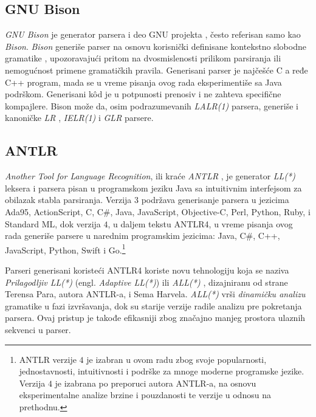 \subsection{GNU Bison}
\label{subsec:GNUBison}
\emph{GNU Bison} \cite{GNUBison} je generator parsera i deo GNU projekta \cite{GNUProject}, često referisan samo kao \emph{Bison}. \emph{Bison} generiše parser na osnovu korisnički definisane kontekstno slobodne gramatike \cite{AutomataTheory}, upozoravajući pritom na dvosmislenosti prilikom parsiranja ili nemogućnost primene gramatičkih pravila. Generisani parser je najčešće C a ređe C++ program, mada se u vreme pisanja ovog rada eksperimentiše sa Java podrškom. Generisani k\^od je u potpunosti prenosiv i ne zahteva specifične kompajlere. Bison može da, osim podrazumevanih \emph{LALR(1)} \cite{DragonBook} parsera, generiše i kanoničke \emph{LR} \cite{LR}, \emph{IELR(1)} \cite{IELR1} i \emph{GLR} \cite{GLR} parsere.

\subsection{ANTLR}
\label{subsec:ANTLR}
\emph{Another Tool for Language Recognition}, ili kraće \emph{ANTLR} \cite{ANTLR}, je generator \emph{LL(*)} \cite{LLStar} leksera i parsera pisan u programskom jeziku Java sa intuitivnim interfejsom za obilazak stabla parsiranja. Verzija $3$ podržava generisanje parsera u jezicima Ada95, ActionScript, C, C\#, Java, JavaScript, Objective-C, Perl, Python, Ruby, i Standard ML, dok verzija $4$, u daljem tekstu ANTLR4, u vreme pisanja ovog rada generiše parsere u narednim programskim jezicima: Java, C\#, C++, JavaScript, Python, Swift i Go.\footnote{ANTLR verzije $4$ je izabran u ovom radu zbog svoje popularnosti, jednostavnosti, intuitivnosti i podrške za mnoge moderne programske jezike. Verzija $4$ je izabrana po preporuci autora ANTLR-a, na osnovu eksperimentalne analize brzine i pouzdanosti te verzije u odnosu na prethodnu.}

Parseri generisani koristeći ANTLR4 koriste novu tehnologiju koja se naziva \emph{Prilagodljiv LL(*)} (engl. \emph{Adaptive LL(*)}) ili \emph{ALL(*)} \cite{ANTLRReference}, dizajniranu od strane Terensa Para, autora ANTLR-a, i Sema Harvela. \emph{ALL(*)} vrši \emph{dinamičku analizu} gramatike u fazi izvršavanja, dok su starije verzije radile analizu pre pokretanja parsera. Ovaj pristup je takođe efikasniji zbog značajno manjeg prostora ulaznih sekvenci u parser.

